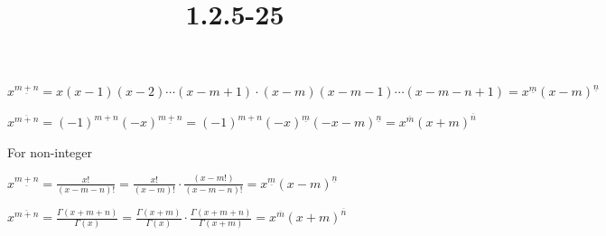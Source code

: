 \documentclass{article}
\title{1.2.5-25}
\begin{document}
\maketitle

\( x^{\underline{m+n}} = x(x-1)(x-2)\cdots(x-m+1)\cdot(x-m)(x-m-1)\cdots(x-m-n+1) = x^{\underline{m}}(x-m)^{\underline{n}} \)

\( x^{\overline{m+n}} = (-1)^{m+n}(-x)^{\underline{m+n}} = (-1)^{m+n}(-x)^{\underline{m}}(-x-m)^{\underline{n}} = x^{\overline{m}} (x+m)^{\overline{n}} \)

For non-integer

\( x^{\underline{m+n}} = \frac{x!}{(x-m-n)!} = \frac{x!}{(x-m)!} \cdot \frac{(x-m!)}{(x-m-n)!} = x^{\underline{m}}(x-m)^{\underline{n}} \)

\( x^{\overline{m+n}} = \frac{\Gamma(x + m + n)}{\Gamma(x)} = \frac{\Gamma(x+m)}{\Gamma(x)} \cdot \frac{\Gamma(x+m+n)}{\Gamma(x+m)} = x^{\overline{m}} (x+m)^{\overline{n}} \)
\end{document}
